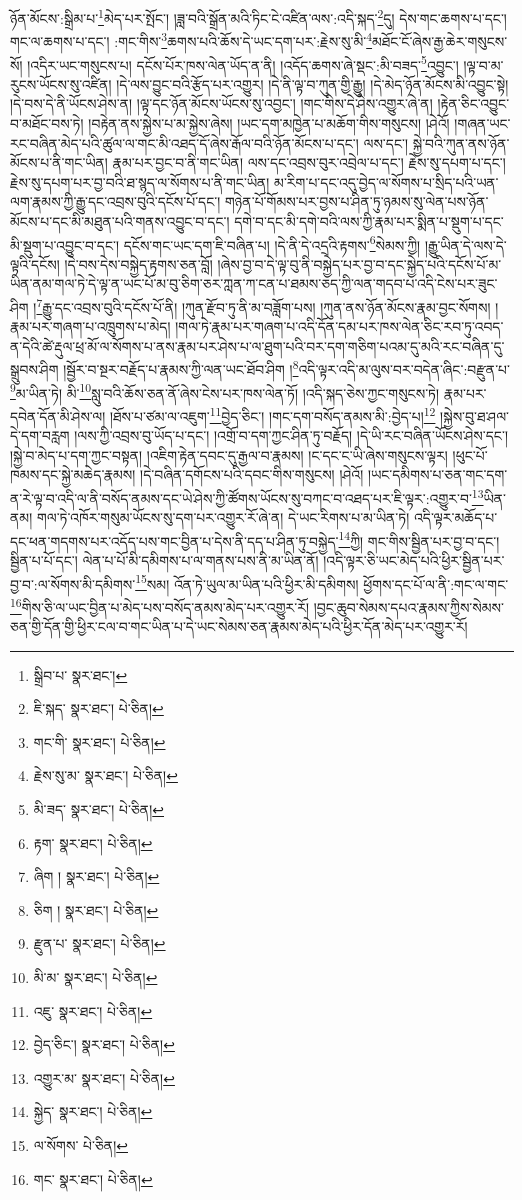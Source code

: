 ཉོན་མོངས་:སྒྲིམ་པ་\footnote{སྒྲིབ་པ་  སྣར་ཐང་། }མེད་པར་སྤོང་། །ཟླ་བའི་སྒྲོན་མའི་ཏིང་ངེ་འཛིན་ལས་:འདི་སྐད་\footnote{ཇི་སྐད་  སྣར་ཐང་།  པེ་ཅིན། }དུ། དེས་གང་ཆགས་པ་དང་། གང་ལ་ཆགས་པ་དང་། :གང་གིས་\footnote{གང་གི་  སྣར་ཐང་།  པེ་ཅིན། }ཆགས་པའི་ཆོས་དེ་ཡང་དག་པར་:རྗེས་སུ་མི་\footnote{རྗེས་སུ་མ་  སྣར་ཐང་།  པེ་ཅིན། }མཐོང་ངོ་ཞེས་རྒྱ་ཆེར་གསུངས་སོ། །འདིར་ཡང་གསུངས་པ། དངོས་པོར་ཁས་ལེན་ཡོད་ན་ནི། །འདོད་ཆགས་ཞེ་སྡང་:མི་བཟད་\footnote{མི་ཟད་  སྣར་ཐང་།  པེ་ཅིན། }འབྱུང་། །ལྟ་བ་མ་རུངས་ཡོངས་སུ་འཛིན། །དེ་ལས་བྱུང་བའི་རྩོད་པར་འགྱུར། །དེ་ནི་ལྟ་བ་ཀུན་གྱི་རྒྱུ། །དེ་མེད་ཉོན་མོངས་མི་འབྱུང་སྟེ། །དེ་བས་དེ་ནི་ཡོངས་ཤེས་ན། །ལྟ་དང་ཉོན་མོངས་ཡོངས་སུ་འབྱང་། །གང་གིས་དེ་ཤེས་འགྱུར་ཞེ་ན། །རྟེན་ཅིང་འབྱུང་བ་མཐོང་བས་ཏེ། །བརྟེན་ནས་སྐྱེས་པ་མ་སྐྱེས་ཞེས། །ཡང་དག་མཁྱེན་པ་མཆོག་གིས་གསུངས། །ཤེའོ། །གཞན་ཡང་རང་བཞིན་མེད་པའི་ཚུལ་ལ་གང་མི་འཐད་དོ་ཞེས་རྒོལ་བའི་ཉོན་མོངས་པ་དང་། ལས་དང་། སྐྱེ་བའི་ཀུན་ནས་ཉོན་མོངས་པ་ནི་གང་ཡིན། རྣམ་པར་བྱང་བ་ནི་གང་ཡིན། ལས་དང་འབྲས་བུར་འབྲེལ་པ་དང་། རྗེས་སུ་དཔག་པ་དང་། རྗེས་སུ་དཔག་པར་བྱ་བའི་ཐ་སྙད་ལ་སོགས་པ་ནི་གང་ཡིན། མ་རིག་པ་དང་འདུ་བྱེད་ལ་སོགས་པ་སྲིད་པའི་ཡན་ལག་རྣམས་ཀྱི་རྒྱུ་དང་འབྲས་བུའི་དངོས་པོ་དང་། གཉེན་པོ་གོམས་པར་བྱས་པ་ཤིན་ཏུ་ཉམས་སུ་ལེན་པས་ཉོན་མོངས་པ་དང་མི་མཐུན་པའི་གནས་འབྱུང་བ་དང་། དགེ་བ་དང་མི་དགེ་བའི་ལས་ཀྱི་རྣམ་པར་སྨིན་པ་སྡུག་པ་དང་མི་སྡུག་པ་འབྱུང་བ་དང་། དངོས་གང་ཡང་དག་ཇི་བཞིན་པ། །དེ་ནི་དེ་འདྲའི་རྟགས་\footnote{རྟག་  སྣར་ཐང་།  པེ་ཅིན། }སེམས་ཀྱི། །རྒྱུ་ཡིན་དེ་ལས་དེ་ལྟའི་དངོས། །དེ་བས་དེས་བསྐྱེད་རྟགས་ཅན་བློ། །ཞེས་བྱ་བ་དེ་ལྟ་བུ་ནི་བསྐྱེད་པར་བྱ་བ་དང་སྐྱེད་པའི་དངོས་པོ་མ་ཡིན་ནམ་གལ་ཏེ་དེ་ལྟ་ན་ཡང་པོ་མ་བུ་ཅིག་ཅར་ཀླན་ཀ་ངན་པ་ཐམས་ཅད་ཀྱི་ལན་གདབ་པ་འདི་ངེས་པར་ཟུང་ཤིག །\footnote{ཞིག །  སྣར་ཐང་།  པེ་ཅིན། }རྒྱུ་དང་འབྲས་བུའི་དངོས་པོ་ནི། །ཀུན་རྫོབ་ཏུ་ནི་མ་བཟློག་པས། །ཀུན་ནས་ཉོན་མོངས་རྣམ་བྱང་སོགས། །རྣམ་པར་གཞག་པ་འཁྲུགས་པ་མེད། །གལ་ཏེ་རྣམ་པར་གཞག་པ་འདི་དོན་དམ་པར་ཁས་ལེན་ཅིང་རབ་ཏུ་འབད་ན་དེའི་ཚེ་རྡུལ་ཕྲ་མོ་ལ་སོགས་པ་ནས་རྣམ་པར་ཤེས་པ་ལ་ཐུག་པའི་བར་དག་གཅིག་པའམ་དུ་མའི་རང་བཞིན་དུ་སྒྲུབས་ཤིག །སྦྱོར་བ་སྔར་བརྗོད་པ་རྣམས་ཀྱི་ལན་ཡང་ཐོབ་ཤིག །\footnote{ཅིག །  སྣར་ཐང་།  པེ་ཅིན། }འདི་ལྟར་འདི་མ་ལུས་བར་བདེན་ཞིང་:བརྫུན་པ་\footnote{རྫུན་པ་  སྣར་ཐང་།  པེ་ཅིན། }མ་ཡིན་ཏེ། མི་\footnote{མི་མ་  སྣར་ཐང་།  པེ་ཅིན། }སླུ་བའི་ཆོས་ཅན་ནོ་ཞེས་ངེས་པར་ཁས་ལེན་ཏོ། །འདི་སྐད་ཅེས་ཀྱང་གསུངས་ཏེ། རྣམ་པར་དབེན་དོན་མི་ཤེས་ལ། །ཐོས་པ་ཙམ་ལ་འཇུག་\footnote{འཇུ་  སྣར་ཐང་།  པེ་ཅིན། }བྱེད་ཅིང་། །གང་དག་བསོད་ནམས་མི་:བྱེད་པ།\footnote{བྱེད་ཅིང་།  སྣར་ཐང་།  པེ་ཅིན། } །སྐྱེས་བུ་ཐ་ཤལ་དེ་དག་བརླག །ལས་ཀྱི་འབྲས་བུ་ཡོད་པ་དང་། །འགྲོ་བ་དག་ཀྱང་ཤིན་ཏུ་བརྗོད། །དེ་ཡི་རང་བཞིན་ཡོངས་ཤེས་དང་། །སྐྱེ་བ་མེད་པ་དག་ཀྱང་བསྟན། །འཇིག་རྟེན་དབང་དུ་རྒྱལ་བ་རྣམས། །ང་དང་ང་ཡི་ཞེས་གསུངས་ལྟར། །ཕུང་པོ་ཁམས་དང་སྐྱེ་མཆེད་རྣམས། །དེ་བཞིན་དགོངས་པའི་དབང་གིས་གསུངས། །ཤེའོ། །ཡང་དམིགས་པ་ཅན་གང་དག་ན་རེ་ལྟ་བ་འདི་ལ་ནི་བསོད་ནམས་དང་ཡེ་ཤེས་ཀྱི་ཚོགས་ཡོངས་སུ་བཀང་བ་འཐད་པར་ཇི་ལྟར་:འགྱུར་བ་\footnote{འགྱུར་མ་  སྣར་ཐང་།  པེ་ཅིན། }ཡིན་ནམ། གལ་ཏེ་འཁོར་གསུམ་ཡོངས་སུ་དག་པར་འགྱུར་རོ་ཞེ་ན། དེ་ཡང་རིགས་པ་མ་ཡིན་ཏེ། འདི་ལྟར་མཆོད་པ་དང་ཕན་གདགས་པར་འདོད་པས་གང་བྱིན་པ་དེས་ནི་དད་པ་ཤིན་ཏུ་བསྐྱེད་\footnote{སྐྱེད་  སྣར་ཐང་།  པེ་ཅིན། }ཀྱི། གང་གིས་སྦྱིན་པར་བྱ་བ་དང་། སྦྱིན་པ་པོ་དང་། ལེན་པ་པོ་མི་དམིགས་པ་ལ་གནས་པས་ནི་མ་ཡིན་ནོ། །འདི་ལྟར་ཅི་ཡང་མེད་པའི་ཕྱིར་སྦྱིན་པར་བྱ་བ་:ལ་སོགས་མི་དམིགས་\footnote{ལ་སོགས་  པེ་ཅིན། }སམ། འོན་ཏེ་ཡུལ་མ་ཡིན་པའི་ཕྱིར་མི་དམིགས། ཕྱོགས་དང་པོ་ལ་ནི་:གང་ལ་གང་\footnote{གང་  སྣར་ཐང་།  པེ་ཅིན། }གིས་ཅི་ལ་ཡང་བྱིན་པ་མེད་པས་བསོད་ནམས་མེད་པར་འགྱུར་རོ། །བྱང་ཆུབ་སེམས་དཔའ་རྣམས་ཀྱིས་སེམས་ཅན་གྱི་དོན་གྱི་ཕྱིར་ངལ་བ་གང་ཡིན་པ་དེ་ཡང་སེམས་ཅན་རྣམས་མེད་པའི་ཕྱིར་དོན་མེད་པར་འགྱུར་རོ། 